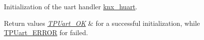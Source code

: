 Initialization of the uart handler \hyperlink{group___k_n_x___p_h___t_p_u_a_r_t___private___variables_ga9308eecc1a4f261fab20bd754fd5d5fc}{knx\+\_\+huart}. 


\begin{DoxyRetVals}{Return values}
{\em \hyperlink{group___k_n_x___t_p_uart___exported___types_gga75271248dbdd8cec608012ca76739f36aa8bc181a8cd20f68faf0314359f58a25}{T\+P\+Uart\+\_\+\+OK}} & for a successful initialization, while \hyperlink{group___k_n_x___t_p_uart___exported___types_gga75271248dbdd8cec608012ca76739f36add998069d703bc6f9b5aea74aa1e501e}{T\+P\+Uart\+\_\+\+E\+R\+R\+OR} for failed. \\
\hline
\end{DoxyRetVals}
